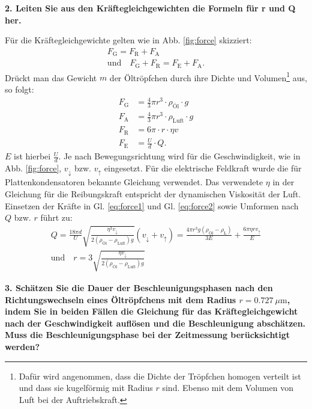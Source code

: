 \vspace{0,5cm}
\noindent \textbf{2. Leiten Sie aus den Kräftegleichgewichten die Formeln für r und Q her.}

Für die Kräftegleichgewichte gelten wie in Abb. \ref{fig:force} skizziert:
\begin{align}
\label{eq:force1}
F_\text{G} = F_\text{R} + F_\text{A} \\
\label{eq:force2}
\text{und} \quad F_\text{G} + F_\text{R} = F_\text{E} + F_\text{A}.
\end{align}
Drückt man das Gewicht $m$ der Öltröpfchen durch ihre Dichte und Volumen\footnote{Dafür wird angenommen, dass die Dichte der Tröpfchen homogen verteilt ist und dass sie kugelförmig mit Radius $r$ sind. Ebenso mit dem Volumen von Luft bei der Auftriebskraft.} aus, so folgt:
\begin{align}
F_\text{G} &= \frac{4}{3}\pi r^3 \cdot \rho_\text{Öl} \cdot g\\
F_\text{A} &= \frac{4}{3}\pi r^3 \cdot \rho_\text{Luft} \cdot g\\
F_\text{R} &= 6\pi \cdot r \cdot \eta v\\
F_\text{E} &= \frac{U}{d} \cdot Q. \label{eq:eForce}
\end{align}
$E$ ist hierbei $\frac{U}{d}$. 
Je nach Bewegungsrichtung wird für die Geschwindigkeit, wie in Abb. \ref{fig:force}, $v_{\downarrow}$ bzw. $v_{\uparrow}$ eingesetzt. 
Für die elektrische Feldkraft wurde die für Plattenkondensatoren bekannte Gleichung verwendet. Das verwendete $\eta$ in der Gleichung für die Reibungskraft entspricht der dynamischen Viskosität der Luft.
Einsetzen der Kräfte in Gl. \ref{eq:force1} und Gl. \ref{eq:force2} sowie Umformen nach $Q$ bzw. $r$ führt zu:
\begin{align}
\label{eq:Ladung}
Q = \frac{18\pi d}{U} \sqrt{\frac{\eta^3 v_\downarrow}{2(\rho_\text{Öl}-\rho_\text{Luft})g}}(v_\downarrow + v_\uparrow) = \frac{4\pi r^3g(\rho_\text{Öl}-\rho_\text{L})}{3E}+ \frac{6\pi \eta r v_\uparrow}{E} \\
\text{und} \quad r = 3 \sqrt{\frac{\eta v_\downarrow}{2(\rho_\text{Öl}-\rho_\text{Luft})g}}
\end{align}

\vspace{0,5cm}
\noindent \textbf{3. Schätzen Sie die Dauer der Beschleunigungsphasen nach den Richtungswechseln eines Öltröpfchens mit dem Radius $r = \SI{0,727}{\mu\m}$, indem Sie in beiden Fällen die Gleichung für das Kräftegleichgewicht nach der Geschwindigkeit auflösen und die Beschleunigung abschätzen. Muss die Beschleunigungsphase bei der Zeitmessung berücksichtigt werden?}

